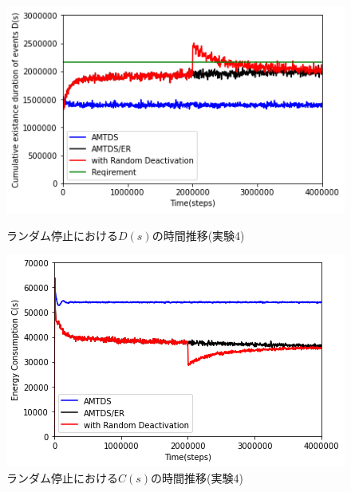 \documentclass[12pt,a4j,twoside]{jarticle}
\begin{document}
  \begin{figure}
    \centering
    \includegraphics[width=0.9\hsize]{figures/ds_graph_3600_ave_ER_Office_randomStop.png}
    \caption{ランダム停止における$D(s)$の時間推移(実験4)}
    \label{fig:ds_RandomStop}
    \vspace{12pt}
    \centering
    \includegraphics[width=0.9\hsize]{figures/cs_graph_3600_ave_ER_Office_randomStop.png}
    \caption{ランダム停止における$C(s)$の時間推移(実験4)}
    \label{fig:cs_RandomStop}
  \end{figure}
\end{document}
